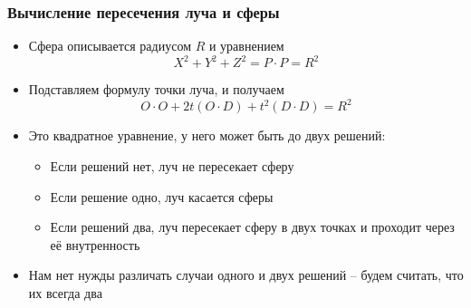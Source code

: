 \documentclass[10pt]{beamer}
\begin{document}
\begin{frame}
\frametitle{Вычисление пересечения луча и сферы}
\begin{itemize}
\item Сфера описывается радиусом \begin{math}R\end{math} и уравнением
\begin{equation}
X^2+Y^2+Z^2=P\cdot P = R^2
\end{equation}
\pause
\item Подставляем формулу точки луча, и получаем
\begin{equation}
O\cdot O + 2t (O\cdot D) + t^2 (D\cdot D) = R^2
\end{equation}
\pause
\item Это квадратное уравнение, у него может быть до двух решений:
\pause
\begin{itemize}
\item Если решений нет, луч не пересекает сферу
\item Если решение одно, луч касается сферы
\item Если решений два, луч пересекает сферу в двух точках и проходит через её внутренность
\end{itemize}
\pause
\item Нам нет нужды различать случаи одного и двух решений -- будем считать, что их всегда два
\end{itemize}
\end{frame}
\end{document}
